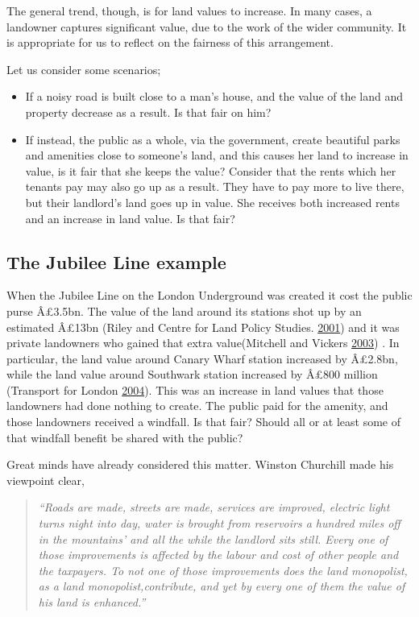 \documentclass[]{tufte-handout}
\providecommand{\tightlist}{%
  \setlength{\itemsep}{0pt}\setlength{\parskip}{0pt}}
\begin{document}
The general trend, though, is for land values to increase. In many
cases, a landowner captures significant value, due to the work of the
wider community. It is appropriate for us to reflect on the fairness of
this arrangement.

Let us consider some scenarios;

\begin{itemize}
\tightlist
\item
  If a noisy road is built close to a man's house, and the value of the
  land and property decrease as a result. Is that fair on him?\\
\item
  If instead, the public as a whole, via the government, create
  beautiful parks and amenities close to someone's land, and this causes
  her land to increase in value, is it fair that she keeps the value?
  Consider that the rents which her tenants pay may also go up as a
  result. They have to pay more to live there, but their landlord's land
  goes up in value. She receives both increased rents and an increase in
  land value. Is that fair?
\end{itemize}

\hypertarget{the-jubilee-line-example}{%
\subsection{The Jubilee Line example}\label{the-jubilee-line-example}}

When the Jubilee Line on the London Underground was created it cost the
public purse Â£3.5bn. The value of the land around its stations shot up
by an estimated Â£13bn (Riley and Centre for Land Policy Studies.
\protect\hyperlink{ref-Riley2001}{2001}) and it was private landowners
who gained that extra value(Mitchell and Vickers
\protect\hyperlink{ref-Mitchell}{2003}) . In particular, the land value
around Canary Wharf station increased by Â£2.8bn, while the land value
around Southwark station increased by Â£800 million (Transport for
London \protect\hyperlink{ref-TransportforLondon2004}{2004}). This was
an increase in land values that those landowners had done nothing to
create. The public paid for the amenity, and those landowners received a
windfall. Is that fair? Should all or at least some of that windfall
benefit be shared with the public?

Great minds have already considered this matter. Winston Churchill made
his viewpoint clear,

\begin{quote}
\emph{``Roads are made, streets are made, services are improved,
electric light turns night into day, water is brought from reservoirs a
hundred miles off in the mountains' and all the while the landlord sits
still. Every one of those improvements is affected by the labour and
cost of other people and the taxpayers. To not one of those improvements
does the land monopolist, as a land monopolist,contribute, and yet by
every one of them the value of his land is enhanced.''}
\end{quote}
\end{document}

